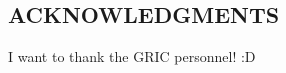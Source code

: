 



\vspace*{0.5in}
\begin{center}
\section*{ACKNOWLEDGMENTS}
\end{center}


\noindent I want to thank the GRIC personnel! :D
\newline
\noindent
\blindtext %


\newpage



\vspace*{2in}
\begin{center}
\emph{\blindtext} %
\end{center}
